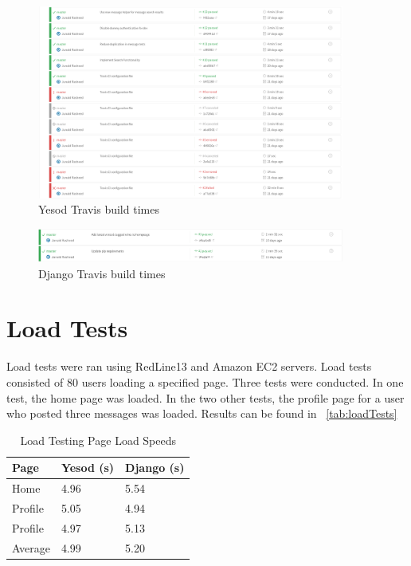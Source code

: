 \begin{figure}[H]
	\centering
	\includegraphics[width=0.9\textwidth]{final_report/pics/yesodTravis.png}
	\caption{Yesod Travis build times}
	\label{fig:yesodTravis}
\end{figure}

\begin{figure}[H]
	\centering
	\includegraphics[width=0.9\textwidth]{final_report/pics/djangoTravis.png}
	\caption{Django Travis build times}
	\label{fig:djangoTravis}
\end{figure}

\section{Load Tests}

Load tests were ran using RedLine13 and Amazon EC2 servers. Load tests consisted of 80
users loading a specified page. Three tests were conducted. In one test, the home page
was loaded. In the two other tests, the profile page for a user who posted three
messages was loaded. Results can be found in ~\ref{tab:loadTests}

\begin{table}[H]
	\caption{Load Testing Page Load Speeds}
	\begin{center}
		\begin{tabular}{ | l | l | l |}
			\hline
			Page & Yesod (s) & Django (s) \\
			\hline
			Home & 4.96 & 5.54 \\
			Profile & 5.05 & 4.94 \\
			Profile & 4.97 & 5.13 \\
			Average & 4.99 & 5.20 \\
			\hline
		\end{tabular}
	\end{center}
	\label{tab:loadTest1}
\end{table}

